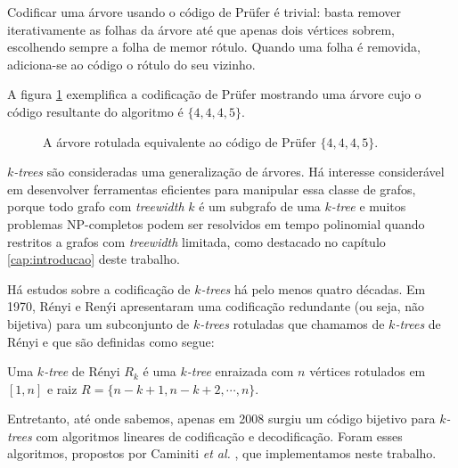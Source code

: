 Codificar uma árvore usando o código de Prüfer é trivial: basta remover iterativamente as folhas da árvore até que apenas dois vértices sobrem, escolhendo sempre a folha de memor rótulo. Quando uma folha é removida, adiciona-se ao código o rótulo do seu vizinho.

A figura \ref{fig:prufer} exemplifica a codificação de Prüfer mostrando uma árvore cujo o código resultante do algoritmo é $\{4, 4, 4, 5\}$.

\begin{figure}
  \centering

  \caption{A árvore rotulada equivalente ao código de Prüfer $\{4, 4, 4, 5\}$.}
  \label{fig:prufer}
\end{figure}

\vspace{2em}

\emph{$k$-trees} \cite{harary} são consideradas uma generalização de árvores. Há interesse considerável em desenvolver ferramentas eficientes para manipular essa classe de grafos, porque todo grafo com \emph{treewidth} $k$ é um subgrafo de uma \emph{$k$-tree} e muitos problemas NP-completos podem ser resolvidos em tempo polinomial quando restritos a grafos com \emph{treewidth} limitada, como destacado no capítulo \ref{cap:introducao} deste trabalho.

Há estudos sobre a codificação de \emph{$k$-trees} há pelo menos quatro décadas. Em 1970, Rényi e Renýi apresentaram uma codificação redundante (ou seja, não bijetiva) para um subconjunto de \emph{$k$-trees} rotuladas que chamamos de \emph{$k$-trees} de Rényi e que são definidas como segue:

\begin{definition}
  \cite{renyi} Uma \emph{$k$-tree} de Rényi $R_k$ é uma \emph{$k$-tree} enraizada com $n$ vértices rotulados em $[1, n]$ e raiz $R = \{n-k+1, n-k+2, \cdots, n\}$.
\end{definition}

Entretanto, até onde sabemos, apenas em 2008 surgiu um código bijetivo para \emph{$k$-trees} com algoritmos lineares de codificação e decodificação. Foram esses algoritmos, propostos por Caminiti \emph{et al.} \cite{caminiti}, que implementamos neste trabalho.

